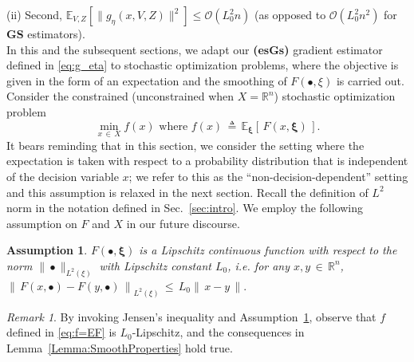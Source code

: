\documentclass[11pt,reqno]{amsart}
\newcommand{\1}{{\bf 1}}
\newcommand{\2}{{\bf 2}}
\newcommand{\mr}[1]{{\color{blue}#1}}
\newcommand{\pc}[1]{{\color{cyan}#1}}
\newcommand{\us}[1]{\textcolor{red}{#1}}
\newcommand{\bxi}{\boldsymbol{\xi}}
\newcommand{\E}{\mathbb E}
\newcommand{\R}{\mathbb R}
\numberwithin{equation}{section}
\newtheorem{assumption}{Assumption}[section]
\theoremstyle{remark}
\newtheorem{remark}{Remark}[section]
\begin{document}
{			\noindent (ii) Second,  $\mathbb{E}_{V,Z}[\|{g}_\eta(x,V,Z)\|^2] \le \mathcal{O}(L_0^2n)$ (as opposed to $\mathcal{O}(L_0^2 n^2)$ for {\bf GS} estimators). \\
			
			In this and the subsequent sections, we adapt our {\bf (esGs)} gradient estimator defined in \eqref{eq:g_eta} to stochastic optimization problems, where the objective is given in the form of an expectation {and the smoothing of $F(\bullet,\xi)$ is carried out}. Consider the constrained (unconstrained when $X=\R^n$) stochastic optimization problem
			\begin{equation}\label{eq:f=EF}
				\min_{x \, \in \, X} f(x) \text{ where }	f(x) \, \triangleq \, \mathbb{E}_{\bxi}\left[\, F(x,\bxi)\, \right]. 
			\end{equation}
			It bears reminding that in this section, we consider the setting where the expectation is taken with respect to a probability distribution that is independent of the decision variable $x$; we refer to this as the ``non-decision-dependent'' setting and this assumption is relaxed in the next section. Recall the definition of $L^2$ norm in the notation defined in Sec.~\ref{sec:intro}. We employ the following assumption on $F$ and $X$ in our future discourse.
			\begin{assumption}\label{asm:ascvgstochastic}
				\label{asm:covstoc1} %
					$F(\bullet, \bxi)$ is a Lipschitz continuous function with respect to the norm $\| \bullet \|_{L^2(\xi)}$ with Lipschitz constant $L_0$, i.e. for any $x, y\, \in \, \R^n$, 
					$
					\left\|\, F(x, \bullet) - F(y, \bullet)\, \right\|_{L^2(\xi)} \, \leq \, L_0 \|\, x-y \, \|.
					$ 
				\end{assumption}
				\begin{remark}\label{rem:EF-Lip}
					By invoking Jensen's inequality and Assumption~\ref{asm:ascvgstochastic}, observe that $f$ defined in \eqref{eq:f=EF} is $L_0$-Lipschitz, and the consequences in Lemma~\ref{Lemma:SmoothProperties} hold true.
				\end{remark}
				
}
\end{document}
